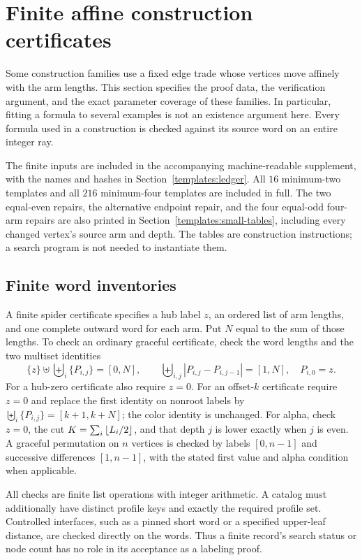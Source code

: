\section{Finite affine construction certificates}
\label{app:template-certificates}

Some construction families use a fixed edge trade whose vertices move
affinely with the arm lengths.  This section specifies the proof data,
the verification argument, and the exact parameter coverage of these
families.  In particular, fitting a formula to several examples is not
an existence argument here.  Every formula used in a construction is
checked against its source word on an entire integer ray.

The finite inputs are included in the accompanying machine-readable
supplement, with the names and hashes in Section~\ref{templates:ledger}.
All $16$ minimum-two templates and all $216$ minimum-four templates
are included in full.  The two equal-even repairs, the alternative
endpoint repair, and the four equal-odd four-arm repairs are also
printed in Section~\ref{templates:small-tables}, including every
changed vertex's source arm and depth.  The tables are construction
instructions; a search program is not needed to instantiate them.

\subsection{Finite word inventories}
\label{templates:finite-check}

A finite spider certificate specifies a hub label $z$, an ordered list
of arm lengths, and one complete outward word for each arm.  Put
$N$ equal to the sum of those lengths.  To check an ordinary graceful
certificate, check the word lengths and the two multiset identities
\[
 \{z\}\uplus\biguplus_i\{P_{i,j}\}=[0,N],\qquad
 \biguplus_{i,j}|P_{i,j}-P_{i,j-1}|=[1,N],\quad P_{i,0}=z.
\]
For a hub-zero certificate also require $z=0$.  For an offset-$k$
certificate require $z=0$ and replace the first identity on nonroot
labels by $\biguplus_i\{P_{i,j}\}=[k+1,k+N]$; the color identity
is unchanged.  For alpha, check $z=0$, the cut
$K=\sum_i\left\lfloor L_i/2\right\rfloor$, and that depth $j$ is lower exactly when
$j$ is even.  A graceful permutation on $n$ vertices is checked by
labels $[0,n-1]$ and successive differences $[1,n-1]$, with the
stated first value and alpha condition when applicable.

All checks are finite list operations with integer arithmetic.  A
catalog must additionally have distinct profile keys and exactly
the required profile set.  Controlled interfaces, such as a pinned
short word or a specified upper-leaf distance, are checked directly
on the words.  Thus a finite record's search status or node count
has no role in its acceptance as a labeling proof.

